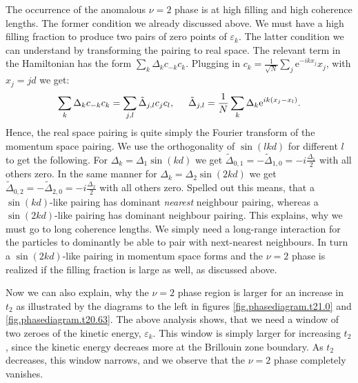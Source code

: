 The occurrence of the anomalous $\nu = 2$ phase is at high filling and high coherence lengths. The former condition we already discussed above. We must have a high filling fraction to produce two pairs of zero points of $\varepsilon_k$. The latter condition we can understand by transforming the pairing to real space. The relevant term in the Hamiltonian has the form $\sum_k \Delta_k c_{-k}c_{k}$. Plugging in $c_k = \frac{1}{\sqrt{N}}\sum_j \text{e}^{-ikx_j}x_j$, with $x_j = jd$ we get:
\begin{equation}
\sum_k \Delta_k c_{-k}c_{k} = \sum_{j,l} \tilde{\Delta}_{j,l}c_jc_l, \hspace{0.5cm} \tilde{\Delta}_{j,l} = \frac{1}{N}\sum_k\Delta_k\text{e}^{ik(x_j-x_l)}. \nonumber
\end{equation}
Hence, the real space pairing is quite simply the Fourier transform of the momentum space pairing. We use the orthogonality of $\sin(lkd)$ for different $l$ to get the following. For $\Delta_k = \Delta_1\sin(kd)$ we get $\tilde{\Delta}_{0,1} = -\tilde{\Delta}_{1,0} = -i\frac{\Delta_1}{2}$ with all others zero. In the same manner for $\Delta_k = \Delta_2\sin(2kd)$ we get $\tilde{\Delta}_{0,2} = -\tilde{\Delta}_{2,0} = -i\frac{\Delta_2}{2}$ with all others zero. Spelled out this means, that a $\sin(kd)$-like pairing has dominant \textit{nearest} neighbour pairing, whereas a $\sin(2kd)$-like pairing has dominant  neighbour pairing. This explains, why we must go to long coherence lengths. We simply need a long-range interaction for the particles to dominantly be able to pair with next-nearest neighbours. In turn a $\sin(2kd)$-like pairing in momentum space forms and the $\nu = 2$ phase is realized if the filling fraction is large as well, as discussed above. 

Now we can also explain, why the $\nu = 2$ phase region is larger for an increase in $t_2$ as illustrated by the diagrams to the left in figures \ref{fig.phasediagram.t21.0} and \ref{fig.phasediagram.t20.63}. The above analysis shows, that we need a window of two zeroes of the kinetic energy, $\varepsilon_k$. This window is simply larger for increasing $t_2$, since the kinetic energy decreaes more at the Brillouin zone boundary. As $t_2$ decreases, this window narrows, and we observe that the $\nu = 2$ phase completely vanishes. 

